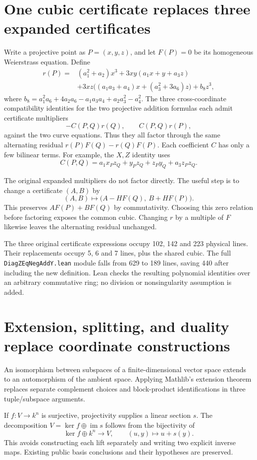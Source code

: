\documentclass[11pt]{article}
\newcommand{\src}[1]{\nolinkurl{#1}}
\begin{document}
\section{One cubic certificate replaces three expanded certificates}
Write a projective point as $P=(x,y,z)$, and let $F(P)=0$ be its
homogeneous Weierstrass equation. Define
\begin{align*}
r(P)={}&(a_1^2+a_2)x^3+3xy(a_1x+y+a_3z)\\
 &+3xz\big((a_1a_3+a_4)x+(a_3^2+3a_6)z\big)+b_8z^3,
\end{align*}
where $b_8=a_1^2a_6+4a_2a_6-a_1a_3a_4+a_2a_3^2-a_4^2$.
The three cross-coordinate compatibility identities for the two projective
addition formulas each admit certificate multipliers
\[
 -C(P,Q)r(Q),\qquad C(P,Q)r(P),
\]
against the two curve equations. Thus they all factor through the same
alternating residual $r(P)F(Q)-r(Q)F(P)$. Each coefficient $C$ has only a
few bilinear terms. For example, the $X,Z$ identity uses
\[
 C(P,Q)=a_1x_Pz_Q+y_Pz_Q+z_Py_Q+a_3z_Pz_Q.
\]

The original expanded multipliers do not factor directly. The useful step
is to change a certificate $(A,B)$ by
\[
 (A,B)\longmapsto\big(A-HF(Q),\ B+HF(P)\big).
\]
This preserves $AF(P)+BF(Q)$ by commutativity. Choosing this zero relation
before factoring exposes the common cubic. Changing $r$ by a multiple of
$F$ likewise leaves the alternating residual unchanged.

The three original certificate expressions occupy 102, 142 and 223 physical
lines. Their replacements occupy 5, 6 and 7 lines, plus the shared cubic.
The full \src{DiagZEqNegAddY.lean} module falls from 629 to 189 lines,
saving 440 after including the new definition. Lean checks the resulting
polynomial identities over an arbitrary commutative ring; no division or
nonsingularity assumption is added.

\section{Extension, splitting, and duality replace coordinate constructions}
An isomorphism between subspaces of a finite-dimensional vector space
extends to an automorphism of the ambient space. Applying Mathlib's extension
theorem replaces separate complement choices and block-product identifications
in three tuple/subspace arguments.

If $f:V\to k^n$ is surjective, projectivity supplies a linear section $s$.
The decomposition $V=\ker f\oplus\operatorname{im}s$ follows from the
bijectivity of
\[
 \ker f\oplus k^n\longrightarrow V,\qquad (u,y)\longmapsto u+s(y).
\]
This avoids constructing each lift separately and writing two explicit
inverse maps. Existing public basis conclusions and their hypotheses are
preserved.
\end{document}
